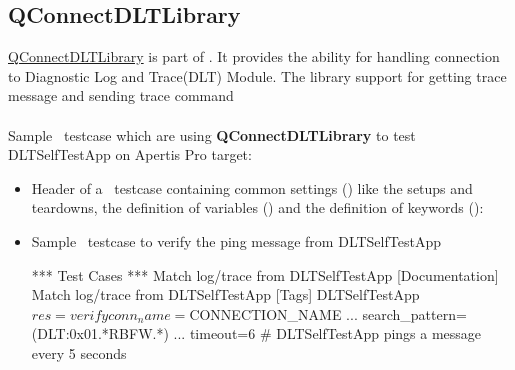 \subsection{QConnectDLTLibrary}
\href{https://sourcecode.socialcoding.bosch.com/projects/ROBFW/repos/robotframework-qconnect-dlt/browse}
{QConnectDLTLibrary} is part of \rfw.
It provides the ability for handling connection to Diagnostic Log and Trace(DLT) Module. 
The library support for getting trace message and sending trace command\\
\\
Sample \rfw\ testcase which are using \textbf{QConnectDLTLibrary} to 
test DLTSelfTestApp on Apertis Pro target:
\begin{itemize}
   \item Header of a \rfw\ testcase containing common settings () like the setups and teardowns,
         the definition of variables ()
         and the definition of keywords ():

   \item Sample \rfw\ testcase to verify the ping message from DLTSelfTestApp
   \begin{robotcode}
*** Test Cases ***
Match log/trace from DLTSelfTestApp
   [Documentation]   Match log/trace from DLTSelfTestApp
   [Tags]   DLTSelfTestApp
   ${res}=    verify     conn_name=${CONNECTION_NAME}
   ...                   search_pattern=(DLT:0x01.*RBFW.*)
   ...                   timeout=6    # DLTSelfTestApp pings a message every 5 seconds


\end{robotcode}
\end{itemize}
